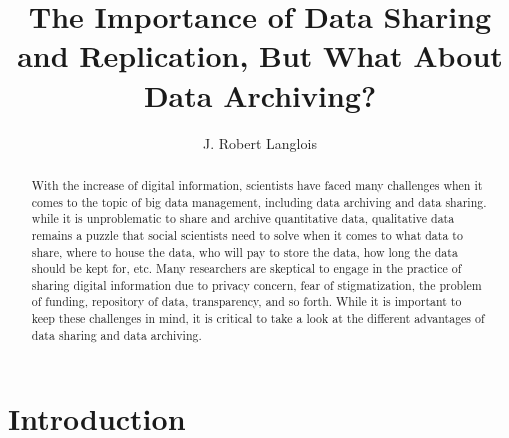 \documentclass[sigconf]{acmart}
\begin{document}
\title{The Importance of Data Sharing and Replication, But What About Data Archiving?}




\author{J. Robert Langlois}




\begin{abstract}


With the increase of digital information, scientists have faced many challenges when it comes to the topic of big data management, including data archiving and data sharing. while it is unproblematic to share and archive quantitative data, qualitative data remains a puzzle that social scientists need to solve when it comes to what data to share, where to house the data, who will pay to store the data, how long the data should be kept for, etc. Many researchers are skeptical to engage in the practice of sharing digital information due to privacy concern, fear of stigmatization, the problem of funding, repository of data, transparency, and so forth. While it is important to keep these challenges in mind, it is critical to take a look at the different advantages of data sharing and data archiving.

\end{abstract}



\maketitle

\section{Introduction}
\end{document}
